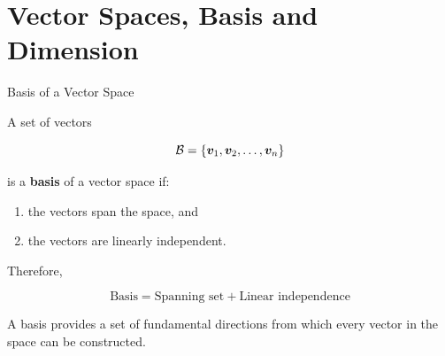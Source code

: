 

\section{Vector Spaces, Basis and Dimension}

\begin{frame}{Basis of a Vector Space}

A set of vectors

\[
\mathcal{B}
=
\{\bm{v}_1,\bm{v}_2,\ldots,\bm{v}_n\}
\]

is a \textbf{basis} of a vector space if:

\begin{enumerate}
    \item the vectors span the space, and
    \item the vectors are linearly independent.
\end{enumerate}

Therefore,

\[
\boxed{
\text{Basis}
=
\text{Spanning set}
+
\text{Linear independence}
}
\]

\vspace{0.4cm}

A basis provides a set of fundamental directions from which
every vector in the space can be constructed.

\end{frame}




